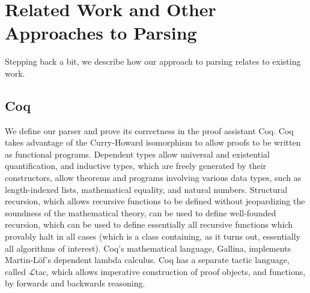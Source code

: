 \chapter{Related Work and Other Approaches to Parsing} \label{sec:related}

  Stepping back a bit, we describe how our approach to parsing relates to existing work.
  
  \section{Coq} \label{sec:coq}
    We define our parser and prove its correctness in the proof assistant Coq.  Coq takes advantage of the Curry-Howard isomorphism to allow proofs to be written as functional programs.  Dependent types allow universal and existential quantification, and inductive types, which are freely generated by their constructors, allow theorems and programs involving various data types, such as length-indexed lists, mathematical equality, and natural numbers.  Structural recursion, which allows recursive functions to be defined without jeopardizing the soundness of the mathematical theory, can be used to define well-founded recursion, which can be used to define essentially all recursive functions which provably halt in all cases (which is a class containing, as it turns out, essentially all algorithms of interest).  Coq's mathematical language, Gallina, implements Martin-L\"of's dependent lambda calculus.  Coq has a separate tactic language, called $\mathcal L$tac, which allows imperative construction of proof objects, and functions, by forwards and backwards reasoning.  
  
